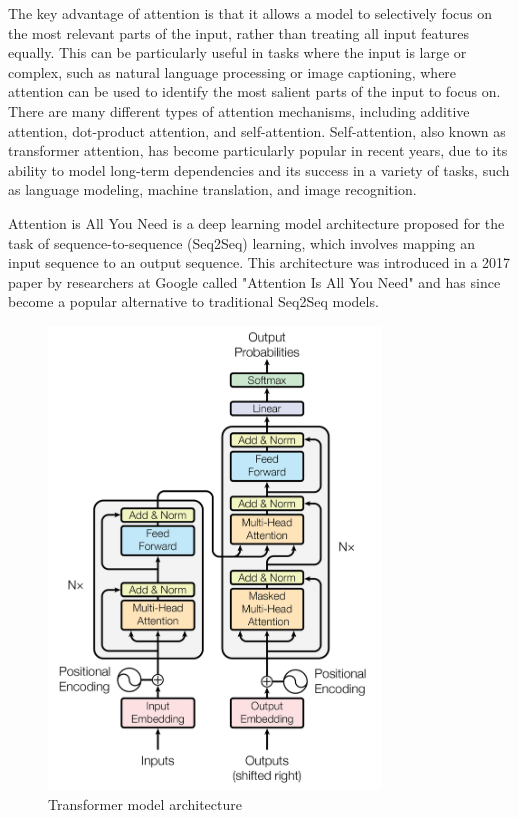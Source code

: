 \documentclass{report}
\begin{document}
The key advantage of attention is that it allows a model to selectively focus on the most relevant parts of the input, rather than treating all input features equally. This can be particularly useful in tasks where the input is large or complex, such as natural language processing or image captioning, where attention can be used to identify the most salient parts of the input to focus on. There are many different types of attention mechanisms, including additive attention, dot-product attention, and self-attention. Self-attention, also known as transformer attention, has become particularly popular in recent years, due to its ability to model long-term dependencies and its success in a variety of tasks, such as language modeling, machine translation, and image recognition.

Attention is All You Need is a deep learning model architecture proposed for the task of sequence-to-sequence (Seq2Seq) learning, which involves mapping an input sequence to an output sequence. This architecture was introduced in a 2017 paper by researchers at Google called "Attention Is All You Need" and has since become a popular alternative to traditional Seq2Seq models.

\begin{figure}[ht]
	\includegraphics[width=250pt]{45}
	\centering
	\caption{Transformer model architecture}
\end{figure}
\end{document}
